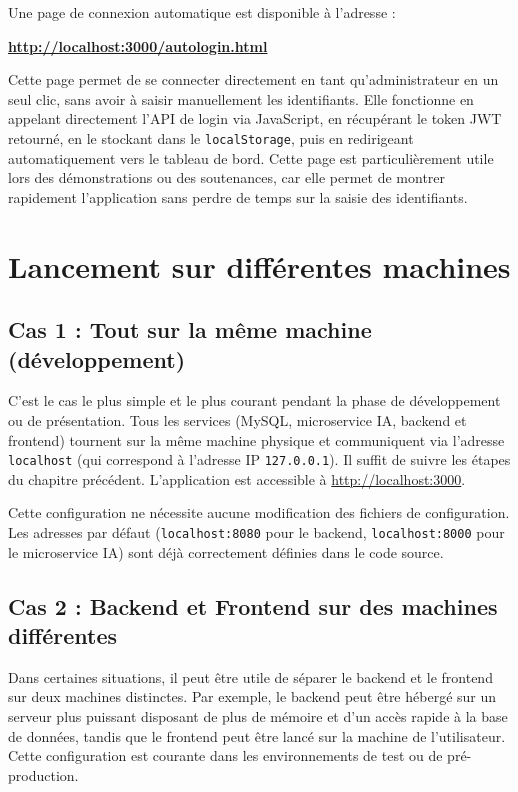 \documentclass[12pt,a4paper]{report}
\begin{document}
Une page de connexion automatique est disponible à l'adresse :

\begin{center}
\large\textbf{\url{http://localhost:3000/autologin.html}}
\end{center}

Cette page permet de se connecter directement en tant qu'administrateur en un seul clic, sans avoir à saisir manuellement les identifiants. Elle fonctionne en appelant directement l'API de login via JavaScript, en récupérant le token JWT retourné, en le stockant dans le \texttt{localStorage}, puis en redirigeant automatiquement vers le tableau de bord. Cette page est particulièrement utile lors des démonstrations ou des soutenances, car elle permet de montrer rapidement l'application sans perdre de temps sur la saisie des identifiants.

\chapter{Lancement sur différentes machines}

\section{Cas 1 : Tout sur la même machine (développement)}

C'est le cas le plus simple et le plus courant pendant la phase de développement ou de présentation. Tous les services (MySQL, microservice IA, backend et frontend) tournent sur la même machine physique et communiquent via l'adresse \texttt{localhost} (qui correspond à l'adresse IP \texttt{127.0.0.1}). Il suffit de suivre les étapes du chapitre précédent. L'application est accessible à \url{http://localhost:3000}.

Cette configuration ne nécessite aucune modification des fichiers de configuration. Les adresses par défaut (\texttt{localhost:8080} pour le backend, \texttt{localhost:8000} pour le microservice IA) sont déjà correctement définies dans le code source.

\section{Cas 2 : Backend et Frontend sur des machines différentes}

Dans certaines situations, il peut être utile de séparer le backend et le frontend sur deux machines distinctes. Par exemple, le backend peut être hébergé sur un serveur plus puissant disposant de plus de mémoire et d'un accès rapide à la base de données, tandis que le frontend peut être lancé sur la machine de l'utilisateur. Cette configuration est courante dans les environnements de test ou de pré-production.
\end{document}
